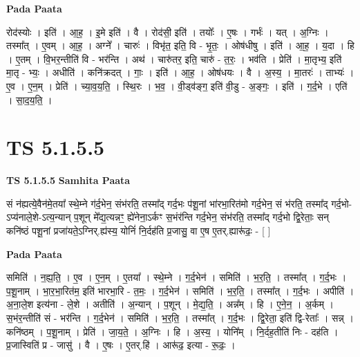 \documentclass[17pt]{extarticle}
\begin{document}
\textbf{Pada Paata} \newline

रोद॑स्योः । इति॑ । आ॒ह॒ । इ॒मे इति॑ । वै । रोद॑सी॒ इति॑ । तयोः᳚ । ए॒षः । गर्भः॑ । यत् । अ॒ग्निः । तस्मा᳚त् । ए॒वम् । आ॒ह॒ । अग्ने᳚ । चारुः॑ । विभृ॑त॒ इति॒ वि - भृ॒तः॒ । ओष॑धीषु । इति॑ । आ॒ह॒ । य॒दा । हि । ए॒तम् । वि॒भर॒न्तीति॑ वि - भर॑न्ति । अथ॑ । चारु॑तर॒ इति॒ चारु॑ - त॒रः॒ । भव॑ति । प्रेति॑ । मा॒तृभ्य॒ इति॑ मा॒तृ - भ्यः॒ । अधीति॑ । कनि॑क्रदत् । गाः॒ । इति॑ । आ॒ह॒ । ओष॑धयः । वै । अ॒स्य॒ । मा॒तरः॑ । ताभ्यः॑ । ए॒व । ए॒न॒म् । प्रेति॑ । च्या॒व॒य॒ति॒ । स्थि॒रः । भ॒व॒ । वी॒ड्व॑ङ्ग॒ इति॑ वी॒डु - अ॒ङ्गः॒ । इति॑ । ग॒र्द॒भे । एति॑ । सा॒द॒य॒ति॒ ।  \newline




\section*{ TS 5.1.5.5 }

\textbf{TS 5.1.5.5 } \newline
\textbf{Samhita Paata} \newline

सं न॑ह्यत्ये॒वैन॑मे॒तया᳚ स्थे॒म्ने ग॑र्द॒भेन॒ संभ॑रति॒ तस्मा᳚द् गर्द॒भः प॑शू॒नां भा॑रभा॒रित॑मो गर्द॒भेन॒ सं भ॑रति॒ तस्मा᳚द् गर्द॒भो-ऽप्य॑नाले॒शे-ऽत्य॒न्यान् प॒शून् मे᳚द्य॒त्यन्नꣳ॒॒ ह्ये॑नेना॒ऽर्कꣳ स॒भंर॑न्ति गर्द॒भेन॒ संभ॑रति॒ तस्मा᳚द् गर्द॒भो द्वि॒रेताः॒ सन् कनि॑ष्ठं पशू॒नां प्रजा॑यते॒ऽग्निर्.ह्य॑स्य॒ योनिं॑ नि॒र्दह॑ति प्र॒जासु॒ वा ए॒ष ए॒तर्.ह्यारू॑ढः॒ - [  ] \newline

\textbf{Pada Paata} \newline

समिति॑ । न॒ह्य॒ति॒ । ए॒व । ए॒न॒म् । ए॒तया᳚ । स्थे॒म्ने । ग॒र्द॒भेन॑ । समिति॑ । भ॒र॒ति॒ । तस्मा᳚त् । ग॒र्द॒भः । प॒शू॒नाम् । भा॒र॒भा॒रित॑म॒ इति॑ भारभा॒रि - त॒मः॒ । ग॒र्द॒भेन॑ । समिति॑ । भ॒र॒ति॒ । तस्मा᳚त् । ग॒र्द॒भः । अपीति॑ । अ॒ना॒ले॒श इत्य॑ना - ले॒शे । अतीति॑ । अ॒न्यान् । प॒शून् । मे॒द्य॒ति॒ । अन्न᳚म् । हि । ए॒ने॒न॒ । अ॒र्कम् । स॒भंर॒न्तीति॑ सं - भर॑न्ति । ग॒र्द॒भेन॑ । समिति॑ । भ॒र॒ति॒ । तस्मा᳚त् । ग॒र्द॒भः । द्वि॒रेता॒ इति॑ द्वि-रेताः᳚ । सन्न् । कनि॑ष्ठम् । प॒शू॒नाम् । प्रेति॑ । जा॒य॒ते॒ । अ॒ग्निः । हि । अ॒स्य॒ । योनि᳚म् । नि॒र्दह॒तीति॑ निः - दह॑ति । प्र॒जास्विति॑ प्र - जासु॑ । वै । ए॒षः । ए॒तर्.हि॑ । आरू॑ढ॒ इत्या - रू॒ढः॒ ।  \newline
\end{document}
